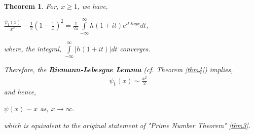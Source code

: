 \documentclass[article,12pt]{elsarticle}
\newtheorem{thm}{Theorem}[section]
\begin{document}
	\begin{thm}\label{thm17}
		For, $x\geq 1$, we have,
		\begin{center}
			$\frac{\psi_{1}(x)}{x^{2}}-\frac{1}{2}(1-\frac{1}{x})^{2}=\frac{1}{2\pi}\int\limits_{-\infty}^{\infty}h(1+it)e^{it.logx}dt$,
		\end{center} 	
		where,  the integral,  $\int\limits_{-\infty}^{\infty}|h(1+it)|dt $ converges.\par
		Therefore, the \textbf{Riemann-Lebesgue Lemma} (cf. Theorem \eqref{thm4}) implies,
		\begin{eqnarray}\label{23}
			\psi_{1}(x)\sim \frac{x^{2}}{2}
		\end{eqnarray}
		and hence,
		\begin{center}
			$\psi(x)\sim x$ \hspace{20pt} as,  $x\rightarrow \infty$.
		\end{center}
		which is equivalent to the original statement of "Prime Number Theorem" \eqref{thm3}.
	\end{thm}	
\end{document}
